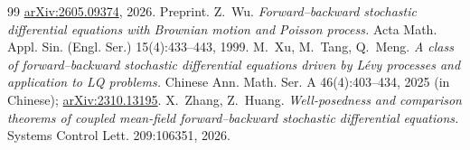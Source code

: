 \documentclass[preprint,12pt]{elsarticle}
\numberwithin{equation}{section}
\theoremstyle{plain}
\theoremstyle{definition}
\theoremstyle{\PaperRemarkStyle}
\begin{document}
\begin{thebibliography}{99}
  \href{https://arxiv.org/abs/2605.09374}{arXiv:2605.09374}, 2026. Preprint.
 Z.~Wu.
  \emph{Forward--backward stochastic differential equations with Brownian motion and
  Poisson process.} Acta Math. Appl. Sin. (Engl. Ser.) 15(4):433--443, 1999.
 M.~Xu, M.~Tang, Q.~Meng.
  \emph{A class of forward--backward stochastic differential equations driven by L\'evy
  processes and application to LQ problems.}
  Chinese Ann. Math. Ser. A 46(4):403--434, 2025 (in Chinese);
  \href{https://arxiv.org/abs/2310.13195}{arXiv:2310.13195}.
 X.~Zhang, Z.~Huang.
  \emph{Well-posedness and comparison theorems of coupled mean-field forward--backward
  stochastic differential equations.} Systems Control Lett. 209:106351, 2026.
\end{thebibliography}

 
\end{document}
